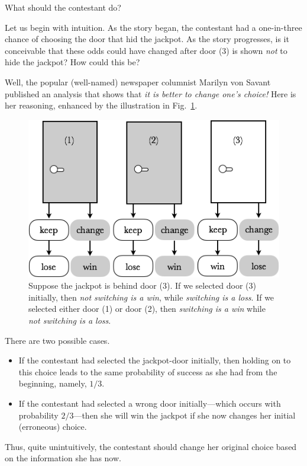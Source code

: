 \medskip

What should the contestant do?  

\medskip

Let us begin with intuition.  As the story began, the contestant had a one-in-three chance of choosing the door that hid the jackpot.  As the story progresses, is it conceivable that these odds could have changed after door (3) is shown {\em not} to hide the jackpot?  How could this be?

\smallskip

Well, the popular (well-named) newspaper columnist Marilyn von Savant published an analysis that shows that {\em it is better to change one's choice!}  Here is her reasoning, enhanced by the illustration in Fig.~\ref{fig:MonthyHall-2}.
\begin{figure}[htb]
\begin{center}
        \includegraphics[scale=0.4]{FiguresMaths/MonthyHall}
        \caption{Suppose the jackpot is behind door (3).  If we selected door (3) initially, then {\em not switching is a win}, while {\em switching is a loss}.  If we selected either door (1) or door (2), then {\em switching is a win}  while {\em not switching is a loss}.}
        \label{fig:MonthyHall-2}
\end{center}
\end{figure}
There are two possible cases.
\begin{itemize}
\item
If the contestant had selected the jackpot-door initially, then holding on to this choice leads to the same probability of success as she had from the beginning, namely, $1/3$.
\medskip\item
If the contestant had selected a wrong door initially---which occurs with probability $2/3$---then she will win the jackpot if she now changes her initial (erroneous) choice.
\end{itemize}
Thus, quite unintuitively, the contestant should change her original choice based on the information she has now.

